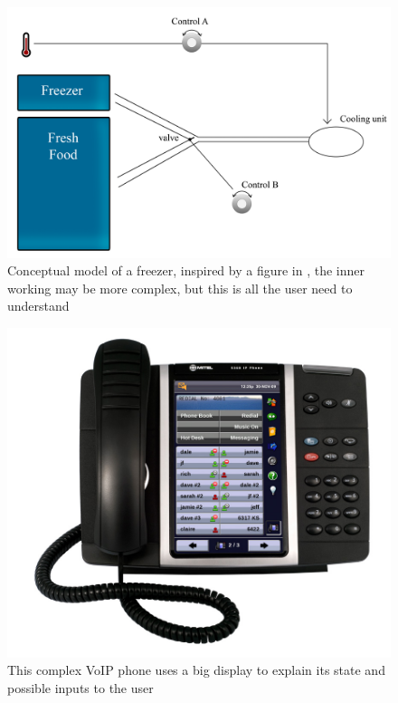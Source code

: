 \documentclass[a4paper,11pt] {article}
\theoremstyle{definition}
\begin{document}
 \begin{minipage}{\linewidth}
      \centering
      \begin{minipage}{0.45\linewidth}
          \begin{figure}[H]
          \centering
              \includegraphics[scale=0.1]{fig-report/conceptual.jpg}
              \caption{Conceptual model of a freezer, inspired by a figure in \cite{Norman02}, the inner working may be more complex, but this is all the user need to understand}
              \label{fig:concept-model}
          \end{figure}
      \end{minipage}
      \hspace{0.05\linewidth}
      \begin{minipage}{0.45\linewidth}
          \begin{figure}[H]
                    \centering
               \includegraphics[scale=0.7]{fig-report/voip-phone.jpg}
              \caption{This complex VoIP phone uses a big display to explain its state and possible inputs to the user}
              \label{fig:make-things-visible}
          \end{figure}
      \end{minipage}
  \end{minipage}
\end{document}
